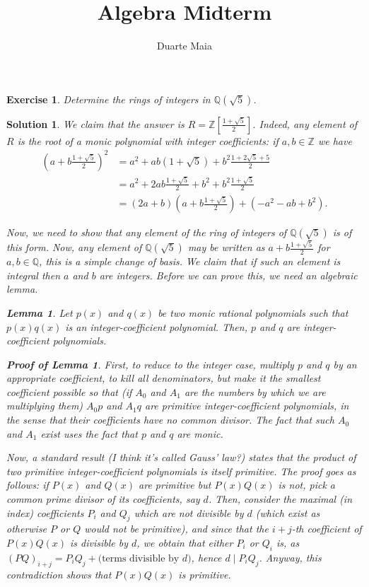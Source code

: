 \documentclass{article}
\title{Algebra Midterm}
\author{Duarte Maia}
\newtheorem{lemma}{Lemma}
\newtheorem{ex}{Exercise}
\theoremstyle{nonumberplain}
\newtheorem{sol}{Solution}
\newtheorem{lemmaproof}{Proof of Lemma}
\newcommand{\Z}{\mathbb{Z}}
\newcommand{\Q}{\mathbb{Q}}
\begin{document}
\maketitle

\begin{ex}
Determine the rings of integers in $\Q(\sqrt5)$.
\end{ex}

\begin{sol}
We claim that the answer is $R = \Z\left[\frac{1+\sqrt5}2\right]$. Indeed, any element of $R$ is the root of a monic polynomial with integer coefficients: if $a, b \in \Z$ we have
\begin{equation}
\begin{aligned}
\left(a + b \frac{1+\sqrt5}2 \right)^2 &= a^2 + ab(1+\sqrt5) + b^2 \frac{1+2\sqrt5 + 5}2\\
&= a^2 + 2ab\frac{1+\sqrt5}2 + b^2 + b^2 \frac{1+\sqrt5}2\\
&= (2a+b) \left(a + b \frac{1+\sqrt5}2 \right) + (-a^2 -ab + b^2).
\end{aligned}
\end{equation}

Now, we need to show that any element of the ring of integers of $\Q(\sqrt5)$ is of this form. Now, any element of $\Q(\sqrt5)$ may be written as $a+b\frac{1+\sqrt5}2$ for $a,b \in \Q$, this is a simple change of basis. We claim that if such an element is integral then $a$ and $b$ are integers. Before we can prove this, we need an algebraic lemma.

\begin{lemma}\label{lemma:ip}
Let $p(x)$ and $q(x)$ be two monic rational polynomials such that $p(x) q(x)$ is an integer-coefficient polynomial. Then, $p$ and $q$ are integer-coefficient polynomials.
\end{lemma}

\begin{lemmaproof}
First, to reduce to the integer case, multiply $p$ and $q$ by an appropriate coefficient, to kill all denominators, but make it the smallest coefficient possible so that (if $A_0$ and $A_1$ are the numbers by which we are multiplying them) $A_0 p$ and $A_1 q$ are primitive integer-coefficient polynomials, in the sense that their coefficients have no common divisor. The fact that such $A_0$ and $A_1$ exist uses the fact that $p$ and $q$ are monic.

Now, a standard result (I think it's called Gauss' law?) states that the product of two primitive integer-coefficient polynomials is itself primitive. The proof goes as follows: if $P(x)$ and $Q(x)$ are primitive but $P(x)Q(x)$ is not, pick a common prime divisor of its coefficients, say $d$. Then, consider the maximal (in index) coefficients $P_i$ and $Q_j$ which are not divisible by $d$ (which exist as otherwise $P$ or $Q$ would not be primitive), and since that the $i+j$-th coefficient of $P(x)Q(x)$ is divisible by $d$, we obtain that either $P_i$ or $Q_i$ is, as $(PQ)_{i+j} = P_i Q_j + \text{(terms divisible by $d$)}$, hence $d \mid P_i Q_j$. Anyway, this contradiction shows that $P(x)Q(x)$ is primitive.


\end{lemmaproof}
\end{sol}
\end{document}
